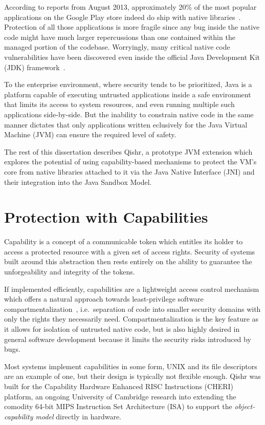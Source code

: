 \documentclass[a4paper,12pt,twoside,openright]{report}
\begin{document}
According to reports from August 2013, approximately 20\% of the most popular applications on the Google Play store indeed do ship with native libraries~\cite{poeplau2014execute}. Protection of all those applications is more fragile since any bug inside the native code might have much larger repercussions than one contained within the managed portion of the codebase. Worryingly, many critical native code vulnerabilities have been discovered even inside the official Java Development Kit (JDK) framework~\cite{Tan:2008:ESS:1496711.1496736}. 

To the enterprise environment, where security tends to be prioritized, Java is a platform capable of executing untrusted applications inside a safe environment that limits its access to system resources, and even running multiple such applications side-by-side. But the inability to constrain native code in the same manner dictates that only applications written eclusively for the Java Virtual Machine (JVM) can ensure the required level of safety.

The rest of this dissertation describes Qishr, a prototype JVM extension which explores the potential of using capability-based mechanisms to protect the VM's core from native libraries attached to it via the Java Native Interface (JNI) and their integration into the Java Sandbox Model.

\section{Protection with Capabilities}

Capability is a concept of a communicable token which entitles its holder to access a protected resource with a given set of access rights. Security of systems built around this abstraction then rests entirely on the ability to guarantee the unforgeability and integrity of the tokens.

If implemented efficiently, capabilities are a lightweight access control mechanism which offers a natural approach towards least-privilege software compartmentalization~\cite{Watson:2010:CPC:1929820.1929824}, i.e.\ separation of code into smaller security domains with only the rights they necessarily need. Compartmentalization is the key feature as it allows for isolation of untrusted native code, but is also highly desired in general software development because it limits the security risks introduced by bugs.

Most systems implement capabilities in some form, UNIX and its file descriptors are an example of one, but their design is typically not flexible enough. Qishr was built for the Capability Hardware Enhanced RISC Instructions (CHERI) platform, an ongoing University of Cambridge research into extending the comodity 64-bit MIPS Instruction Set Architecture (ISA) to support the \emph{object-capability model} directly in hardware.
\end{document}
